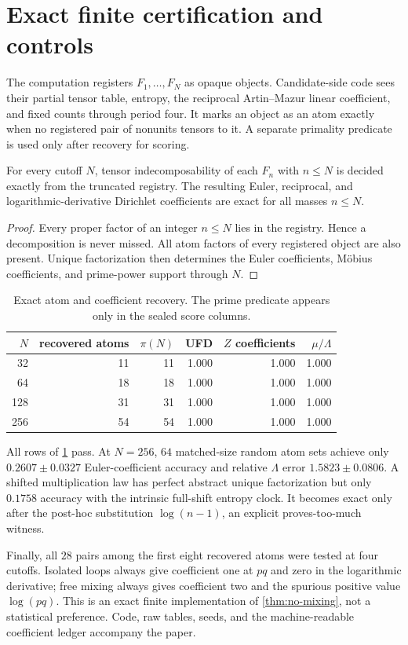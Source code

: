 \section{Exact finite certification and controls}

The computation registers $F_1,\ldots,F_N$ as opaque objects.  Candidate-side
code sees their partial tensor table, entropy, the reciprocal Artin--Mazur
linear coefficient, and fixed counts through period four.  It marks an
object as an atom exactly when no registered pair of nonunits tensors to it.
A separate primality predicate is used only after recovery for scoring.

\begin{proposition}
\label{prop:prefix}
For every cutoff $N$, tensor indecomposability of each $F_n$ with $n\leq N$
is decided exactly from the truncated registry.  The resulting Euler,
reciprocal, and logarithmic-derivative Dirichlet coefficients are exact for
all masses $n\leq N$.
\end{proposition}

\begin{proof}
Every proper factor of an integer $n\leq N$ lies in the registry.  Hence a
decomposition is never missed.  All atom factors of every registered object
are also present.  Unique factorization then determines the Euler
coefficients, M\"obius coefficients, and prime-power support through $N$.
\end{proof}

\begin{table}[t]
\centering
\small
\begin{tabular}{rrrrrr}
\toprule
$N$ & recovered atoms & $\pi(N)$ & UFD & $Z$ coefficients & $\mu/\Lambda$ \\
\midrule
32  & 11 & 11 & 1.000 & 1.000 & 1.000 \\
64  & 18 & 18 & 1.000 & 1.000 & 1.000 \\
128 & 31 & 31 & 1.000 & 1.000 & 1.000 \\
256 & 54 & 54 & 1.000 & 1.000 & 1.000 \\
\bottomrule
\end{tabular}
\caption{Exact atom and coefficient recovery.  The prime predicate appears
only in the sealed score columns.}
\label{tab:main-experiment}
\end{table}

All rows of \cref{tab:main-experiment} pass.  At $N=256$, $64$ matched-size
random atom sets achieve only $0.2607\pm0.0327$ Euler-coefficient accuracy
and relative $\Lambda$ error $1.5823\pm0.0806$.  A shifted multiplication
law has perfect abstract unique factorization but only $0.1758$ accuracy with
the intrinsic full-shift entropy clock.  It becomes exact only after the
post-hoc substitution $\log(n-1)$, an explicit proves-too-much witness.

Finally, all $28$ pairs among the first eight recovered atoms were tested at
four cutoffs.  Isolated loops always give coefficient one at $pq$ and zero in
the logarithmic derivative; free mixing always gives coefficient two and the
spurious positive value $\log(pq)$.  This is an exact finite implementation
of \cref{thm:no-mixing}, not a statistical preference.  Code, raw tables,
seeds, and the machine-readable coefficient ledger accompany the paper.
